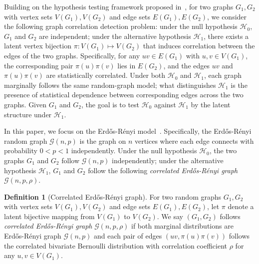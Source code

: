 \documentclass[letterpaper,11pt]{article}
\theoremstyle{definition}
\newtheorem{definition}{Definition}
\newcommand{\maG}{\mathcal{G}}
\newcommand{\maH}{\mathcal{H}}
\newcommand{\nbr}[1]{{\sf\color{red}[#1]}}
\newcommand{\ER}{Erd\H{o}s-R\'enyi }
\begin{document}
Building on the hypothesis testing framework proposed in~\cite{barak2019nearly}, for two graphs $G_1,G_2$ with vertex sets $V(G_1),V(G_2)$ and edge sets $E(G_1), E(G_2)$,
we consider the following graph correlation detection problem: under the null hypothesis $\maH_0$, $G_1$ and $G_2$ are independent; under the alternative hypothesis $\maH_1$, there exists a latent vertex bijection $\pi:V(G_1)\mapsto V(G_2)$ that induces correlation between the edges of the two graphs. 
Specifically, for any $uv\in E(G_1)$ with $u,v\in V(G_1)$, the corresponding pair $\pi(u)\pi(v)$ lies in $E(G_2)$, and the edges $uv$ and $\pi(u)\pi(v)$ are statistically correlated.
Under both \(\maH_0\) and \(\maH_1\), each graph marginally follows the same random-graph model; what distinguishes \(\maH_1\) is the presence of statistical dependence between corresponding edges across the two graphs.
Given $G_1$ and $G_2$, the goal is to test $\maH_0$ against $\maH_1$ by the latent structure
under $\maH_1$. 

In this paper, we focus on the \ER model~\cite{paul1959random}.
Specifically, the \ER random graph $\maG(n,p)$ is the graph on $n$ vertices where each edge connects with probability $0<p<1$ independently. %
Under the null hypothesis $\maH_0$, the two graphs $G_1$ and $G_2$ follow $\maG(n,p)$ independently; under the alternative hypothesis $\maH_1$, $G_1$ and $G_2$ follow the following \emph{correlated \ER graph} $\maG(n,p,\rho)$.
\begin{definition}[Correlated \ER graph]
    For two random graphs $G_1,G_2$ with vertex sets $V(G_1),V(G_2)$ and edge sets $E(G_1),E(G_2)$, let $\pi$ denote a latent bijective mapping from $V(G_1)$ to $V(G_2)$. We say $(G_1,G_2)$ follows \emph{correlated \ER graph} $\maG(n,p,\rho)$ if both marginal distributions are \ER graph $\maG(n,p)$ and each pair of edges $(uv,\pi(u)\pi(v))$ follows the correlated bivariate Bernoulli distribution with correlation coefficient $\rho$ for any $u,v\in V(G_1)$.
\end{definition}
\end{document}
